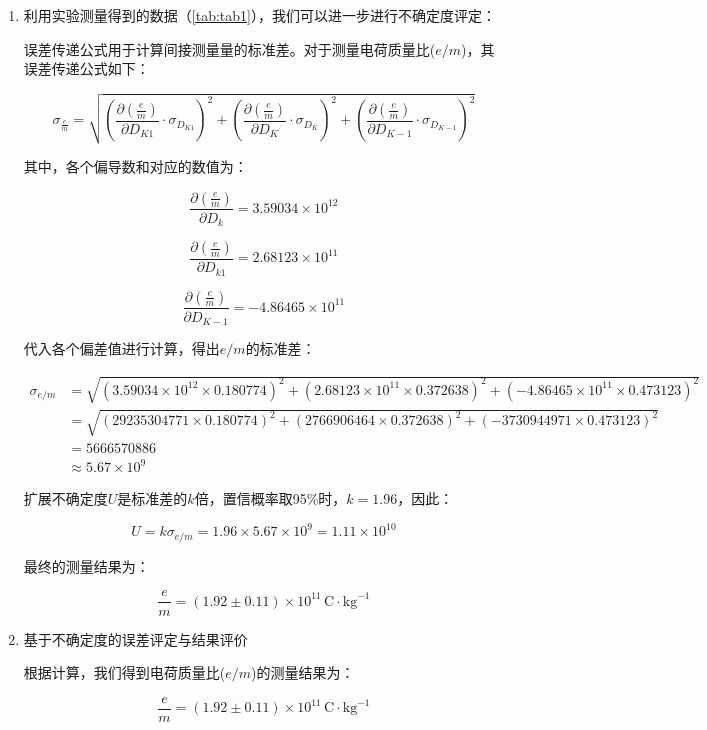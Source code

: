 \documentclass[dvipsnames, svgnames,a4paper,11pt]{article}
\begin{document}
	\begin{enumerate}
		\item 利用实验测量得到的数据（\cref{tab:tab1}），我们可以进一步进行不确定度评定：
		
		误差传递公式用于计算间接测量量的标准差。对于测量电荷质量比($e/m$)，其误差传递公式如下：
		
		\[
		\sigma_{\frac{e}{m}} = \sqrt{\left(\frac{\partial\left(\frac{e}{m}\right)}{\partial D_{K1}} \cdot \sigma_{D_{K1}}\right)^2 + \left(\frac{\partial\left(\frac{e}{m}\right)}{\partial D_K} \cdot \sigma_{D_K}\right)^2 + \left(\frac{\partial\left(\frac{e}{m}\right)}{\partial D_{K-1}} \cdot \sigma_{D_{K-1}}\right)^2}
		\]
		
		其中，各个偏导数和对应的数值为：
		
		\[
		\frac{\partial\left(\frac{e}{m}\right)}{\partial D_k} = 3.59034 \times 10^{12}
		\]
		
		\[
		\frac{\partial\left(\frac{e}{m}\right)}{\partial D_{k1}} = 2.68123 \times 10^{11}
		\]
		
		\[
		\frac{\partial\left(\frac{e}{m}\right)}{\partial D_{K-1}} = -4.86465 \times 10^{11}
		\]
		
		代入各个偏差值进行计算，得出$e/m$的标准差：
		
		\[
		\begin{aligned}
			\sigma_{e/m} &= \sqrt{(3.59034 \times 10^{12} \times 0.180774)^2 + (2.68123 \times 10^{11} \times 0.372638)^2 + (-4.86465 \times 10^{11} \times 0.473123)^2} \\
			&= \sqrt{(29235304771 \times 0.180774)^2 + (2766906464 \times 0.372638)^2 + (-3730944971 \times 0.473123)^2} \\
			&= 5666570886 \\
			&\approx 5.67 \times 10^9
		\end{aligned}
		\]
		
		扩展不确定度$U$是标准差的$k$倍，置信概率取95\%时，$k = 1.96$，因此：
		
		\[
		U = k \sigma_{e/m} = 1.96 \times 5.67 \times 10^9 = 1.11 \times 10^{10}
		\]
		
		最终的测量结果为：
		
		\[
		\frac{e}{m} = (1.92 \pm 0.11) \times 10^{11} \, \text{C} \cdot \text{kg}^{-1}
		\]
		
		\item 基于不确定度的误差评定与结果评价
		
		根据计算，我们得到电荷质量比($e/m$)的测量结果为：
		
		\[
		\frac{e}{m} = (1.92 \pm 0.11) \times 10^{11} \, \text{C} \cdot \text{kg}^{-1}
		\]
		

\end{enumerate}
\end{document}
